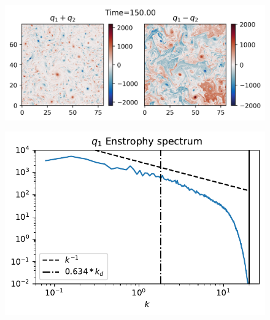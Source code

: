 \begin{figure}
    \centering
    \includegraphics{2Lay_qbrbc_t150d00}
    \caption{}
    \label{fig:2Lay_qbrbc_t150d00}
\end{figure}

\begin{figure}
    \centering
    \includegraphics{2Lay_q1spec_t150d00}
    \caption{}
    \label{fig:2Lay_q1spec_t150d00}
\end{figure}
